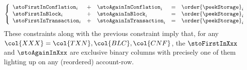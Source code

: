 \begin{description}
		\[
			\left\{ \begin{array}{lclcl}
				\stoFirstInConflation  _{i} & + & \stoAgainInConflation  _{i} & = & \order{\peekStorage} _{i} \\
				\stoFirstInBlock       _{i} & + & \stoAgainInBlock       _{i} & = & \order{\peekStorage} _{i} \\
				\stoFirstInTransaction _{i} & + & \stoAgainInTransaction _{i} & = & \order{\peekStorage} _{i} \\
			\end{array} \right.
		\]
		\saNote{} These constraints along with the previous constraint imply that, for any $\col{XXX} = \col{TXN}, \col{BLC}, \col{CNF}$, the 
		$\stoFirstInXxx$ and $\stoAgainInXxx$ are exclusive binary columns with precisely one of them lighting up on any (reordered) account-row.
\end{description}

